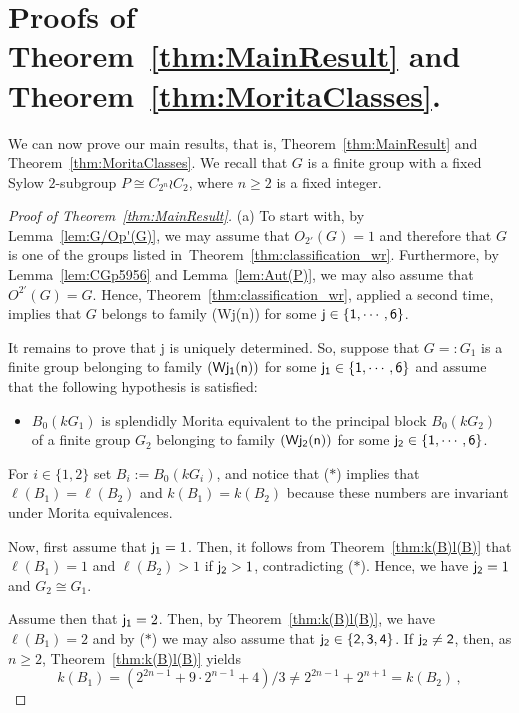 \documentclass[12pt,a4paper]{amsart}
\theoremstyle{plain}\newtheorem{Theorem}{Theorem}[section]
\theoremstyle{plain}\newtheorem{Conjecture}[Theorem]{Conjecture}
\theoremstyle{plain}\newtheorem{Corollary}[Theorem]{Corollary}
\theoremstyle{plain}\newtheorem{Lemma}[Theorem]{Lemma}
\theoremstyle{plain}\newtheorem{Proposition}[Theorem]{Proposition}
\theoremstyle{definition}\newtheorem{Definition}[Theorem]{Definition}
\theoremstyle{definition}\newtheorem{Example}[Theorem]{Example}
\theoremstyle{definition}\newtheorem{Examples}[Theorem]{Examples}
\theoremstyle{definition}\newtheorem{Remark}[Theorem]{Remark}
\theoremstyle{definition}\newtheorem{Question}[Theorem]{Question}
\theoremstyle{definition}\newtheorem{Notation}[Theorem]{Notation}
\theoremstyle{definition}\newtheorem{Hypothesis}[Theorem]{Hypothesis}
\theoremstyle{definition}\newtheorem{Assumption}[Theorem]{Assumption}
\theoremstyle{definition}\newtheorem{Strategy}[Theorem]{Strategy}
\theoremstyle{definition}\newtheorem{Contents}[Theorem]{Contents}
\theoremstyle{definition}\newtheorem{Computations}[Theorem]{Computations}
\theoremstyle{definition}\newtheorem{Equivalences}[Theorem]{Equivalences}
\theoremstyle{definition}\newtheorem{Notation/Definition}[Theorem]{Notation/Definition}
\theoremstyle{definition}\newtheorem{noth}[Theorem]{}
\theoremstyle{plain}\newtheorem{Step}[Theorem]{Step}
\begin{document}
\section{Proofs of Theorem~\ref{thm:MainResult} and Theorem~\ref{thm:MoritaClasses}.}\label{sec:proofMainb}

We can now prove our main results, that is, Theorem~\ref{thm:MainResult} and Theorem~\ref{thm:MoritaClasses}. 
We recall that $G$ is a finite group with a fixed  Sylow $2$-subgroup $P\cong C_{2^n}\wr C_2$, where $n\geq 2$ is a fixed integer. 


\begin{proof}[Proof of Theorem~\ref{thm:MainResult}]
{\rm (a)}
To start with, by Lemma~\ref{lem:G/Op'(G)}, we may assume that ${O_{2'}(G)=1}$ 
and therefore that $G$ is one of the groups listed in~Theorem~\ref{thm:classification_wr}. 
Furthermore, by Lemma~\ref{lem:CGp5956} and Lemma~\ref{lem:Aut(P)},
we may also assume  that $O^{2'}(G)=G$. Hence, 
 Theorem~\ref{thm:classification_wr}, applied a second time, implies 
 that $G$ belongs to family {\sf(Wj(n))} for some ${\sf j\in\{1,\cdots,6\}}$.
 \par
 It remains to prove that
{\sf j} is uniquely determined. So, suppose that $G=:G_{1}$ is a finite group belonging to 
family  ${\sf (Wj_1(n))}$ for  some ${\sf j_1}\in\{{\sf1},\cdots,{\sf6}\}$ and assume that  the 
following hypothesis is satisfied:
\begin{itemize}
\item[($\ast$)] $B_{0}(kG_{1})$ is splendidly Morita equivalent to the principal block 
$B_{0}(kG_{2})$ of a finite group $G_{2}$ belonging to family  ${\sf (Wj_2(n))}$  for  some 
${\sf j_2}\in\{{\sf 1},\cdots,{\sf 6}\}$.
\end{itemize}
For $i\in\{1,2\}$ set $B_i:=B_0(kG_i)$, and notice that ($\ast$) implies that 
$\ell(B_{1})=\ell(B_{2})$ and $k(B_{1})=k(B_{2})$ because these numbers 
are invariant under Morita equivalences. 
\par
Now, first assume that ${\sf j_1} = 1$. Then, it follows from Theorem~\ref{thm:k(B)l(B)} 
that $\ell(B_{1})=1$
and  $\ell(B_{2})>1$ if ${\sf j_2} > 1$, contradicting ($\ast$). Hence, we 
have ${\sf j_2} = 1$ and $G_{2}\cong G_{1}$. 
\par
Assume then  that  ${\sf j_1} = 2$. Then, by Theorem~\ref{thm:k(B)l(B)}, we have 
$\ell(B_{1})=2$ and by ($\ast$) we may also assume that ${\sf j_2}\in\{{\sf 2,3,4}\}$. 
If ${\sf j_2} \neq {\sf2}$, then, as $n\geq 2$, Theorem~\ref{thm:k(B)l(B)} yields 
\[
k(B_{1})= (2^{2n-1}+9{\cdot}2^{n-1}+4)/3\neq2^{2n-1}+2^{n+1}=k(B_{2})\,,
\]
\end{proof}
\end{document}
